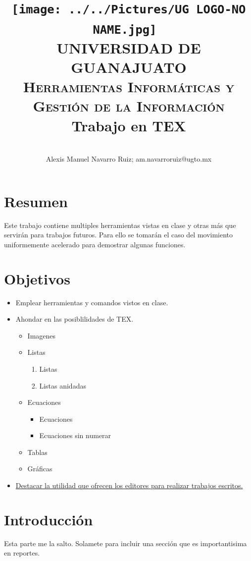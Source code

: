 \documentclass[12pt]{article}
\title{\texttt{[image: ../../Pictures/UG LOGO-NO NAME.jpg]}~\\[1cm]\textsc{\LARGE\bfseries UNIVERSIDAD DE GUANAJUATO}\\ [.3cm] \textsc{\Large \textbf{Herramientas Informáticas y Gestión de la Información}}\\[.8cm] \bfseries\textbf{Trabajo en TEX} }
\author{\\[.8cm] Alexis Manuel Navarro Ruiz; am.navarroruiz@ugto.mx\\}
\begin{document}
\maketitle
\newpage
\section{Resumen}
Este trabajo contiene multiples herramientas vistas en clase y otras más que servirán para trabajos futuros. Para ello se tomarán el caso del movimiento uniformemente acelerado para demostrar algunas funciones.


\section{Objetivos}
\begin{itemize}
\item  Emplear herramientas y comandos vistos en clase.\
\item Ahondar en las posiblilidades de TEX.\
	\begin{itemize}
		\item Imagenes
		\item Listas 
			\begin{enumerate}
				\item Listas
				\item Listas anidadas
			\end{enumerate}
		\item Ecuaciones
			\begin{itemize}
				\item Ecuaciones
				\item Ecuaciones sin numerar
			\end{itemize}
		\item Tablas
		\item Gráficas
	\end{itemize}
\item \underline{Destacar la utilidad que ofrecen los editores para realizar trabajos escritos.}\
\end{itemize}
\section{Introducción}
Esta parte me la salto. Solamete para incluir una sección que es importantisima en reportes.\
\end{document}
